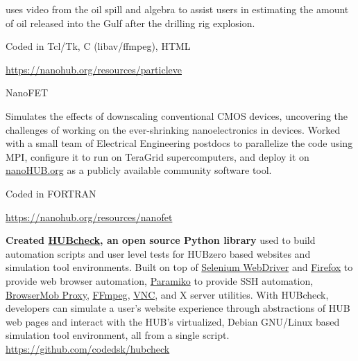 \documentclass[10pt]{article}
\newcommand{\halfblankline}{\quad\vspace{-0.5\baselineskip}\pagebreak[3]}
\begin{document}
\begin{innerlist}
\begin{outerlist}
\begin{innerlist}
                              uses video from the oil spill and algebra to
                              assist users in estimating the amount of oil
                              released into the Gulf after the drilling rig explosion.
                            \item[] Coded in Tcl/Tk, C (libav/ffmpeg), HTML
                            \item[] \url{https://nanohub.org/resources/particleve} \hfill{}
                        \end{innerlist}
                    \item[] NanoFET
                        \begin{innerlist}
                            \item[] Simulates the effects
                              of downscaling conventional CMOS devices,
                              uncovering the challenges of working on the
                              ever-shrinking nanoelectronics in devices.
                              Worked with a small team of Electrical Engineering
                              postdocs to parallelize the code using MPI,
                              configure it to run on TeraGrid supercomputers,
                              and deploy it on \href{https://nanohub.org}{nanoHUB.org}
                              as a publicly available community software
                              tool.
                            \item[] Coded in FORTRAN
                            \item[] \url{https://nanohub.org/resources/nanofet} \hfill{}
                        \end{innerlist}
                \end{outerlist}

            \halfblankline

            \item \textbf{Created \href{https://github.com/codedsk/hubcheck}{HUBcheck},
                an open source Python library} used to build automation scripts
                and user level tests for HUBzero based websites and simulation tool
                environments.  Built on top of
                \href{http://www.seleniumhq.org/projects/webdriver}{Selenium WebDriver}
                and \href{https://www.mozilla.org/en-US/firefox/new}{Firefox}
                to provide web browser automation,
                \href{http://www.paramiko.org}{Paramiko} to provide SSH automation,
                \href{https://bmp.lightbody.net}{BrowserMob Proxy},
                \href{https://www.ffmpeg.org}{FFmpeg},
                \href{http://www.karlrunge.com/x11vnc/}{VNC},
                and X server utilities. With HUBcheck, developers can
                simulate a user's website experience through abstractions of HUB
                web pages and interact with the HUB's virtualized, Debian GNU/Linux
                based simulation tool environment, all from a single script.\\
                \url{https://github.com/codedsk/hubcheck}


\end{innerlist}
\end{document}
